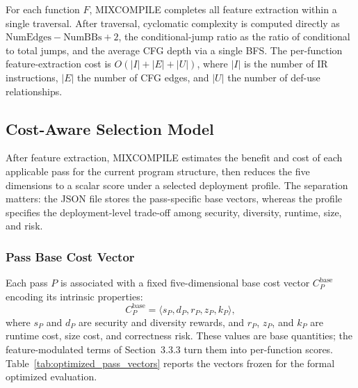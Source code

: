 \documentclass[5p,times,authoryear]{elsarticle}
\theoremstyle{plain}
\theoremstyle{definition}
\theoremstyle{remark}
\begin{document}
For each function $F$, MIXCOMPILE completes all feature extraction within a single
traversal. After traversal, cyclomatic complexity is computed directly as
$\text{NumEdges} - \text{NumBBs} + 2$, the conditional-jump ratio as the ratio of
conditional to total jumps, and the average CFG
depth via a single BFS. The per-function feature-extraction cost is $O(|I| + |E| +
|U|)$, where $|I|$ is the number of IR instructions, $|E|$ the number of CFG edges,
and $|U|$ the number of def-use relationships.

\subsection{Cost-Aware Selection Model}
\label{sec:costmodel}

After feature extraction, MIXCOMPILE estimates the benefit and cost of each applicable
pass for the current program structure, then reduces the five dimensions to a scalar
score under a selected deployment profile. The separation matters: the JSON file
stores the pass-specific base vectors, whereas the profile specifies the
deployment-level trade-off among security, diversity, runtime, size, and risk.

\subsubsection{Pass Base Cost Vector}

Each pass $P$ is associated with a fixed five-dimensional base cost vector
$C_P^{\text{base}}$ encoding its intrinsic properties:
\begin{equation}
C_P^{\text{base}} = \langle s_P, d_P, r_P, z_P, k_P \rangle ,
\label{eq:cost_vector}
\end{equation}
where $s_P$ and $d_P$ are security and diversity rewards, and $r_P$, $z_P$, and
$k_P$ are runtime cost, size cost, and correctness risk. These values are base
quantities; the feature-modulated terms of Section~3.3.3 turn them into
per-function scores. Table~\ref{tab:optimized_pass_vectors}
reports the vectors frozen for the formal optimized evaluation.
\end{document}
